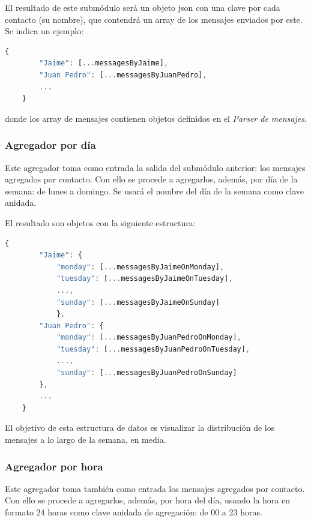 El resultado de este submódulo será un objeto \acrshort{json} con una clave por cada contacto (su nombre), que contendrá un array de los mensajes enviados por este. Se indica un ejemplo:

\begin{lstlisting}[language=JavaScript]
	{
		"Jaime": [...messagesByJaime],
		"Juan Pedro": [...messagesByJuanPedro],
		...
	}
\end{lstlisting}

donde los array de mensajes contienen objetos definidos en el \textit{Parser de mensajes}.

\subsubsection{Agregador por día}

Este agregador toma como entrada la salida del submódulo anterior: los mensajes agregados por contacto. Con ello se procede a agregarlos, además, por día de la semana: de lunes a domingo. Se usará el nombre del día de la semana como clave anidada.

El resultado son objetos con la siguiente estructura:

\begin{lstlisting}[language=JavaScript]
	{
		"Jaime": {
			"monday": [...messagesByJaimeOnMonday],
			"tuesday": [...messagesByJaimeOnTuesday],
			...,
			"sunday": [...messagesByJaimeOnSunday]
			},
		"Juan Pedro": {
			"monday": [...messagesByJuanPedroOnMonday],
			"tuesday": [...messagesByJuanPedroOnTuesday],
			...,
			"sunday": [...messagesByJuanPedroOnSunday]
		},
		...
	}
\end{lstlisting}

El objetivo de esta estructura de datos es visualizar la distribución de los mensajes a lo largo de la semana, en media.

\subsubsection{Agregador por hora}

Este agregador toma también como entrada los mensajes agregados por contacto. Con ello se procede a agregarlos, además, por hora del día, usando la hora en formato 24 horas como clave anidada de agregación: de 00 a 23 horas.

